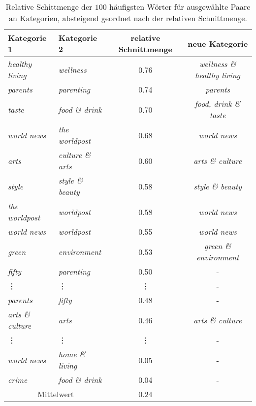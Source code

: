 \documentclass[a4paper,11pt]{article}
\begin{document}
\begin{table}[ht]
\begin{center}
\begin{tabular}{|l|l|c|c|}
  \hline
Kategorie 1 & Kategorie 2  & relative Schnittmenge & neue Kategorie\\
  \hline
\textit{healthy living} & \textit{wellness} & 0.76 & \textit{wellness \& healthy living} \\ 
  \textit{parents} & \textit{parenting} & 0.74 & \textit{parents} \\ 
  \textit{taste} & \textit{food \& drink} & 0.70 & \textit{food, drink \& taste}\\ 
  \textit{world news} & \textit{the worldpost} & 0.68 & \textit{world news}\\ 
  \textit{arts} & \textit{culture \& arts} & 0.60 & \textit{arts \& culture}\\ 
  \textit{style} & \textit{style \& beauty} & 0.58 & \textit{style \& beauty} \\ 
  \textit{the worldpost} & \textit{worldpost} & 0.58 & \textit{world news}\\ 
  \textit{world news} & \textit{worldpost} & 0.55 & \textit{world news}\\ 
  \textit{green} & \textit{environment} & 0.53 & \textit{green \& environment}\\ 
  \textit{fifty} & \textit{parenting} & 0.50 & -\\ 
    \vdots & \vdots & \vdots & -\\
  \textit{parents} & \textit{fifty} & 0.48 & - \\ 
  \textit{arts \& culture} & \textit{arts} & 0.46 & \textit{arts \& culture}\\  
  \vdots & \vdots & \vdots & -\\
  \textit{world news} & \textit{home \& living} & 0.05 & - \\ 
  \textit{crime} & \textit{food \& drink} & 0.04 & -\\
  \hline 
  \hline 
  \multicolumn{2}{|c|}{Mittelwert} &  0.24 & \\
   \hline
\end{tabular}
\caption{Relative Schittmenge der $100$ häufigsten Wörter für ausgewählte Paare an Kategorien, absteigend geordnet nach der relativen Schnittmenge.}
\label{tab:categoryMerge}
\end{center}
\end{table}
\end{document}
